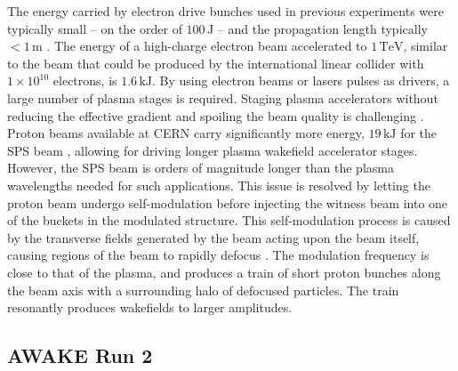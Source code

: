\documentclass[aps,prstab,reprint,amsmath,amssymb,groupedaddress]{revtex4-1}
\newcommand{\unit}[1]{\,\mathrm{#1}}
\newcommand{\nexp}[1]{\times 10^{#1}}
\begin{document}
The energy carried by electron drive bunches used in previous experiments were typically small -- on the order of
$100\unit{J}$ -- and the propagation length typically $<1\unit{m}$ \cite{blumenfeld:2007,caldwell:2009}. The energy of a
high-charge electron beam accelerated to $1\unit{TeV}$, similar to the beam that could be produced by the international
linear collider with $1\nexp{10}$ electrons, is $1.6\unit{kJ}$. By using electron beams or lasers pulses as drivers, a
large number of plasma stages is required. Staging plasma accelerators without reducing the effective gradient and
spoiling the beam quality is challenging \cite{steinke:2016,lindstrom:2016}. Proton beams available at CERN carry
significantly more energy, $19\unit{kJ}$ for the SPS beam \cite{gschwendtner:2016}, allowing for driving longer plasma
wakefield accelerator stages. However, the SPS beam is orders of magnitude longer than the plasma wavelengths needed for
such applications. This issue is resolved by letting the proton beam undergo self-modulation before injecting the
witness beam into one of the buckets in the modulated structure. This self-modulation process is caused by the
transverse fields generated by the beam acting upon the beam itself, causing regions of the beam to rapidly defocus
\cite{kumar:2010}. The modulation frequency is close to that of the plasma, and produces a train of short proton bunches
along the beam axis with a surrounding halo of defocused particles. The train resonantly produces wakefields to larger
amplitudes.

\subsection{AWAKE Run 2}\label{S:I:AWAKE}
\end{document}
